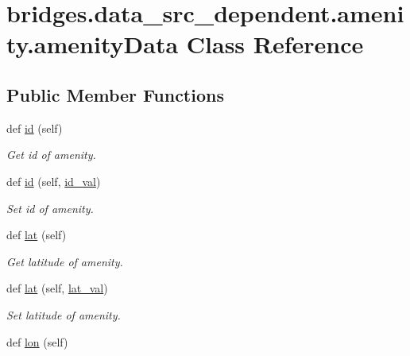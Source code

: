 \hypertarget{classbridges_1_1data__src__dependent_1_1amenity_1_1amenity_data}{}\section{bridges.\+data\+\_\+src\+\_\+dependent.\+amenity.\+amenity\+Data Class Reference}
\label{classbridges_1_1data__src__dependent_1_1amenity_1_1amenity_data}
\subsection*{Public Member Functions}
\begin{DoxyCompactItemize}
\item 
def \hyperlink{classbridges_1_1data__src__dependent_1_1amenity_1_1amenity_data_aa4317e85ae7377eaa66e975c44d6b977}{id} (self)
\begin{DoxyCompactList}\small\item\em Get id of amenity. \end{DoxyCompactList}\item 
def \hyperlink{classbridges_1_1data__src__dependent_1_1amenity_1_1amenity_data_a63b2cdd927d08f9d939bae96bcb1de42}{id} (self, \hyperlink{classbridges_1_1data__src__dependent_1_1amenity_1_1amenity_data_a772d1e7423a3c07e3df0a24b6770a07f}{id\+\_\+val})
\begin{DoxyCompactList}\small\item\em Set id of amenity. \end{DoxyCompactList}\item 
def \hyperlink{classbridges_1_1data__src__dependent_1_1amenity_1_1amenity_data_a44b228c50c5e138546e0e7035fe4616b}{lat} (self)
\begin{DoxyCompactList}\small\item\em Get latitude of amenity. \end{DoxyCompactList}\item 
def \hyperlink{classbridges_1_1data__src__dependent_1_1amenity_1_1amenity_data_a51002cecf15ec0756de9bf03eb0497a8}{lat} (self, \hyperlink{classbridges_1_1data__src__dependent_1_1amenity_1_1amenity_data_a62c0f3cd20edddddef2652895644a6ad}{lat\+\_\+val})
\begin{DoxyCompactList}\small\item\em Set latitude of amenity. \end{DoxyCompactList}\item 
def \hyperlink{classbridges_1_1data__src__dependent_1_1amenity_1_1amenity_data_a0792815050b670799823a7ed9d9c468c}{lon} (self)

\end{DoxyCompactItemize}
